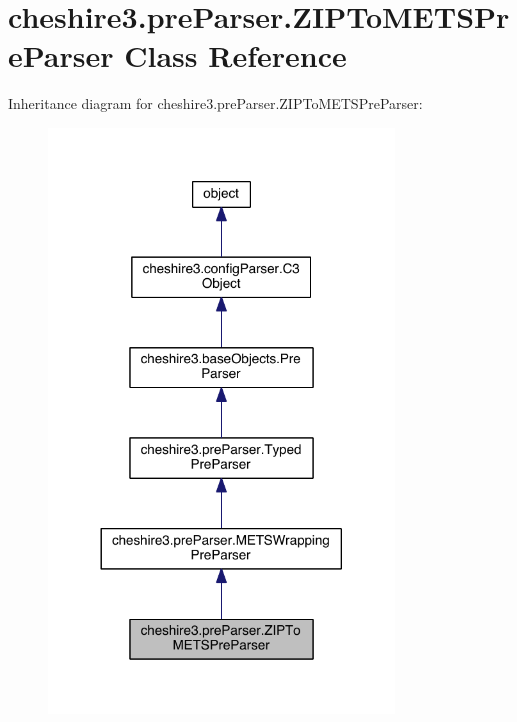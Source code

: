 \hypertarget{classcheshire3_1_1pre_parser_1_1_z_i_p_to_m_e_t_s_pre_parser}{\section{cheshire3.\-pre\-Parser.\-Z\-I\-P\-To\-M\-E\-T\-S\-Pre\-Parser Class Reference}
\label{classcheshire3_1_1pre_parser_1_1_z_i_p_to_m_e_t_s_pre_parser}
}


Inheritance diagram for cheshire3.\-pre\-Parser.\-Z\-I\-P\-To\-M\-E\-T\-S\-Pre\-Parser\-:
\nopagebreak
\begin{figure}[H]
\begin{center}
\leavevmode
\includegraphics[width=260pt]{classcheshire3_1_1pre_parser_1_1_z_i_p_to_m_e_t_s_pre_parser__inherit__graph}
\end{center}
\end{figure}


